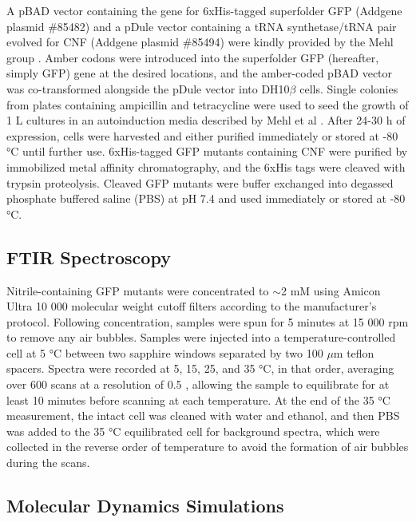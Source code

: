 A pBAD vector containing the gene for 6xHis-tagged superfolder GFP (Addgene plasmid \#85482) and a pDule vector containing a tRNA synthetase/tRNA pair evolved for CNF (Addgene plasmid \#85494) were kindly provided by the Mehl group \cite{Miyake-Stoner2009, Miyake-Stoner2010}.
Amber codons were introduced into the superfolder GFP (hereafter, simply GFP) gene at the desired locations, and the amber-coded pBAD vector was co-transformed alongside the pDule vector into DH10$\beta$ cells.
Single colonies from plates containing ampicillin and tetracycline were used to seed the growth of 1 L cultures in an autoinduction media described by Mehl et al \cite{Hammill2007}.
After 24-30 h of expression, cells were harvested and either purified immediately or stored at -80 \si{\celsius} until further use.
6xHis-tagged GFP mutants containing CNF were purified by immobilized metal affinity chromatography, and the 6xHis tags were cleaved with trypsin proteolysis.
Cleaved GFP mutants were buffer exchanged into degassed phosphate buffered saline (PBS) at pH 7.4 and used immediately or stored at -80 \si{\celsius}. 

\subsection{FTIR Spectroscopy}

Nitrile-containing GFP mutants were concentrated to $\sim$2 mM using Amicon Ultra 10 000 molecular weight cutoff filters according to the manufacturer's protocol.
Following concentration, samples were spun for 5 minutes at 15 000 rpm to remove any air bubbles.
Samples were injected into a temperature-controlled cell at 5 \si{\celsius} between two sapphire windows separated by two 100 $\mu$m teflon spacers.
Spectra were recorded at 5, 15, 25, and 35 \si{\celsius}, in that order, averaging over 600 scans at a resolution of 0.5 \si{\wn}, allowing the sample to equilibrate for at least 10 minutes before scanning at each temperature.
At the end of the 35 \si{\celsius} measurement, the intact cell was cleaned with water and ethanol, and then PBS was added to the 35 \si{\celsius} equilibrated cell for background spectra, which were collected in the reverse order of temperature to avoid the formation of air bubbles during the scans.

\subsection{Molecular Dynamics Simulations}

